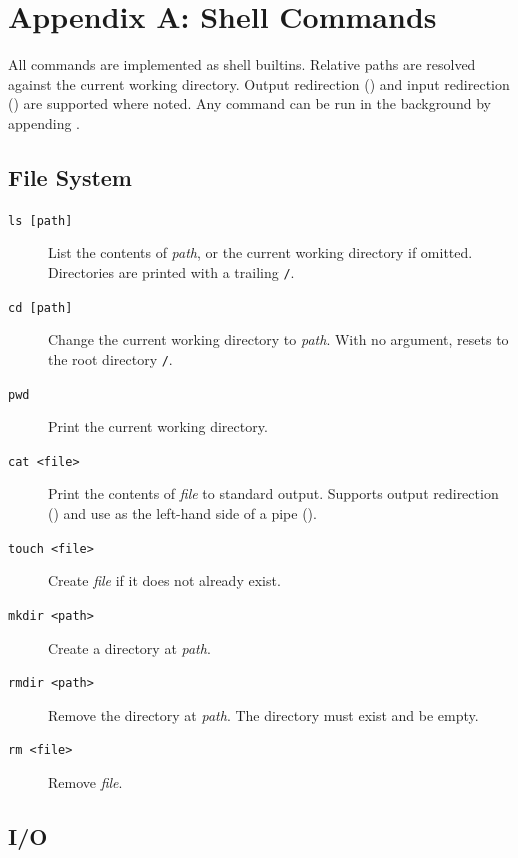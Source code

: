 \chapter*{Appendix A: Shell Commands}{}
\label{appA}

All commands are implemented as shell builtins. Relative paths are resolved against the
current working directory. Output redirection (\cl{>}) and input redirection (\cl{<}) are
supported where noted. Any command can be run in the background by appending \cl{\&}.

\section*{File System}

\begin{description}

\item[\texttt{ls [path]}]
List the contents of \textit{path}, or the current working directory if omitted.
Directories are printed with a trailing \texttt{/}.

\item[\texttt{cd [path]}]
Change the current working directory to \textit{path}. With no argument, resets to
the root directory \texttt{/}.

\item[\texttt{pwd}]
Print the current working directory.

\item[\texttt{cat <file>}]
Print the contents of \textit{file} to standard output. Supports output redirection
() and use as the left-hand side of a pipe
().

\item[\texttt{touch <file>}]
Create \textit{file} if it does not already exist.

\item[\texttt{mkdir <path>}]
Create a directory at \textit{path}.

\item[\texttt{rmdir <path>}]
Remove the directory at \textit{path}. The directory must exist and be empty.

\item[\texttt{rm <file>}]
Remove \textit{file}.

\end{description}

\section*{I/O}

